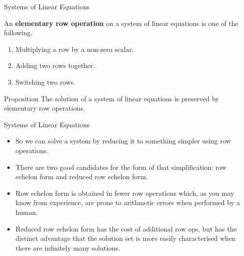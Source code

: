 \documentclass[11pt, xcolor={dvipsnames}, hyperref={colorlinks, allcolors=Blue}]{beamer}
\newcommand\bc[1]{{\usebeamercolor[fg]{frametitle} {\textbf{#1}}}} %
\begin{document}

\begin{frame}{Systems of Linear Equations}

An \bc{elementary row operation} on a system of linear equations is one of the following.\bigskip

\begin{enumerate}[1.]
\item Multiplying a row by a non-zero scalar.
\item Adding two rows together.
\item Switching two rows.
\end{enumerate}
\bigskip

\begin{block}{Proposition}
The solution of a system of linear equations is preserved by elementary row operations.
\end{block}

\end{frame}


\begin{frame}{Systems of Linear Equations}

\begin{itemize}
\setlength{\itemsep}{5mm}
\item So we can solve a system by reducing it to something simpler using row operations.

\item There are two good candidates for the form of that simplification: row echelon form and reduced row echelon form. 

\item Row echelon form is obtained in fewer row operations which, as you may know from experience, are prone to arithmetic errors when performed by a human. 

\item Reduced row echelon form has the cost of additional row ops, but has the distinct advantage that the solution set is more easily characterised when there are infinitely many solutions.
\end{itemize}

\end{frame}
\end{document}
